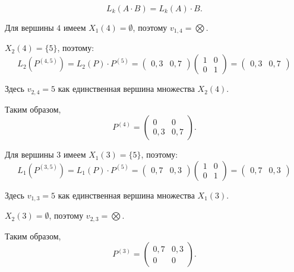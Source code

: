 \[
L_k(A \cdot B) = L_k(A) \cdot B.
\]
\par Для вершины $4$ имеем $X_1(4) = \emptyset$, поэтому $v_{1, 4} = \bigotimes$.
\par $X_2(4) = \{5\}$, поэтому: 
\[L_2(P^{(4, 5)}) = L_2(P) \cdot P^{(5)} = \begin{pmatrix} 0,3 & 0,7 \end{pmatrix} \begin{pmatrix} 1 & 0\\ 0 & 1 \end{pmatrix} = \begin{pmatrix} 0,3 & 0,7 \end{pmatrix} \]
\par Здесь $v_{2, 4} = 5$ как единственная вершина множества $X_2(4)$.
\par Таким образом, 
\[
P^{(4)} = \begin{pmatrix} 0 & 0\\ 0,3 & 0,7 \end{pmatrix}.
\]

\par Для вершины $3$ имеем $X_1(3) = \{5\}$, поэтому: 
\[L_1(P^{(3, 5)}) = L_1(P) \cdot P^{(5)} = \begin{pmatrix} 0,7 & 0,3 \end{pmatrix} \begin{pmatrix} 1 & 0\\ 0 & 1 \end{pmatrix} = \begin{pmatrix} 0,7 & 0,3 \end{pmatrix} \]
\par Здесь $v_{1, 3} = 5$ как единственная вершина множества $X_1(3)$.
\par $X_2(3) = \emptyset$, поэтому $v_{2, 3} = \bigotimes$.
\par Таким образом, 
\[
P^{(3)} = \begin{pmatrix} 0,7 & 0,3\\ 0 & 0 \end{pmatrix}.
\]

